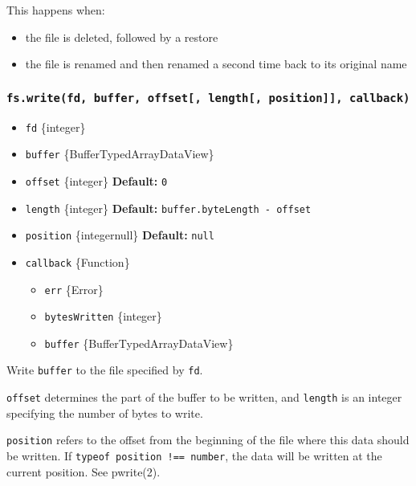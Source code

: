 This happens when:

\begin{itemize}
\tightlist
\item
  the file is deleted, followed by a restore
\item
  the file is renamed and then renamed a second time back to its
  original name
\end{itemize}

\subsubsection{\texorpdfstring{\texttt{fs.write(fd,\ buffer,\ offset{[},\ length{[},\ position{]}{]},\ callback)}}{fs.write(fd, buffer, offset{[}, length{[}, position{]}{]}, callback)}}\label{fs.writefd-buffer-offset-length-position-callback}

\begin{itemize}
\tightlist
\item
  \texttt{fd} \{integer\}
\item
  \texttt{buffer} \{Buffer\textbar TypedArray\textbar DataView\}
\item
  \texttt{offset} \{integer\} \textbf{Default:} \texttt{0}
\item
  \texttt{length} \{integer\} \textbf{Default:}
  \texttt{buffer.byteLength\ -\ offset}
\item
  \texttt{position} \{integer\textbar null\} \textbf{Default:}
  \texttt{null}
\item
  \texttt{callback} \{Function\}

  \begin{itemize}
  \tightlist
  \item
    \texttt{err} \{Error\}
  \item
    \texttt{bytesWritten} \{integer\}
  \item
    \texttt{buffer} \{Buffer\textbar TypedArray\textbar DataView\}
  \end{itemize}
\end{itemize}

Write \texttt{buffer} to the file specified by \texttt{fd}.

\texttt{offset} determines the part of the buffer to be written, and
\texttt{length} is an integer specifying the number of bytes to write.

\texttt{position} refers to the offset from the beginning of the file
where this data should be written. If
\texttt{typeof\ position\ !==\ \textquotesingle{}number\textquotesingle{}},
the data will be written at the current position. See pwrite(2).

